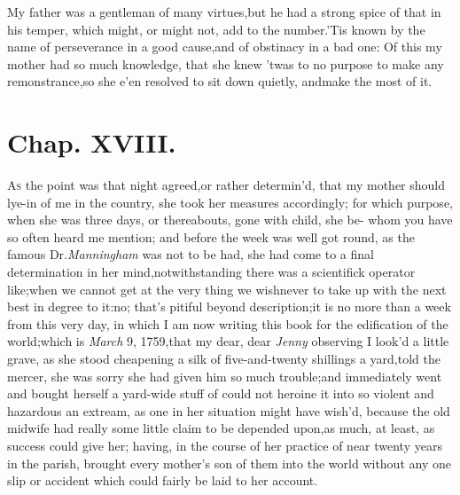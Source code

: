 \documentclass{article}
\begin{document}
\newpage
My father was a gentleman of many virtues,\tsk  but he had a
strong spice of that in his temper, which might, or might not, add
to the number.\tsk  ’Tis known by the name of perseverance
in a good cause,\tsk  and of obstinacy in a bad one: Of this my
mother had so much know\-ledge, that she knew ’twas to no
purpose to make any remonstrance,\tsk  so she e’en resolved
to sit down quietly, and\break make the most of it.

\section{Chap. XVIII.}

\lettrine{A}{s} the point was that night agreed,\break or rather
determin’d, that my mo\-ther should lye-in of me in the country, she
took her measures accordingly; for which purpose, when she was
three days, or thereabouts, gone with child, she be-\pb 
{}
whom you have so often heard me mention; and
before the week was well got round, as the famous Dr.\thinspace \textit{Manningham} was not to be had, she had come to a final
determination in her mind,\tsh  notwith\-standing there was a scientifick \hbox{operator} 
\pb
like;\tsh  when we cannot get at the very thing we
wish\tsh  never to take up with the next best in degree to
it:\tsk  no; that’s pitiful beyond description;\tsk  it is
no more than a week from this very day, in which I am now writing
this book for the edification of the world;\tsk  which is
\textit{March} 9, 1759,\tsh  that my dear, dear \textit{Jenny}
observing I look’d a little grave, as she stood cheapening a silk
of five-and-twenty shillings a yard,\tsk  told the mercer, she was sorry she had given him so
much trouble;\tsk  and immediately went and bought herself a
yard-wide stuff of 
could not heroine it into so violent and hazardous an
extream, as one in her situation might have wish’d, because the\pb
old midwife had really some little claim to be depended upon,\tsk  as
much, at least, as success could give her; having, in the course of
her practice of near twenty years in the parish, brought every
mother’s son of them into the world without any one slip or
accident which could fairly be laid to her account.
\end{document}
